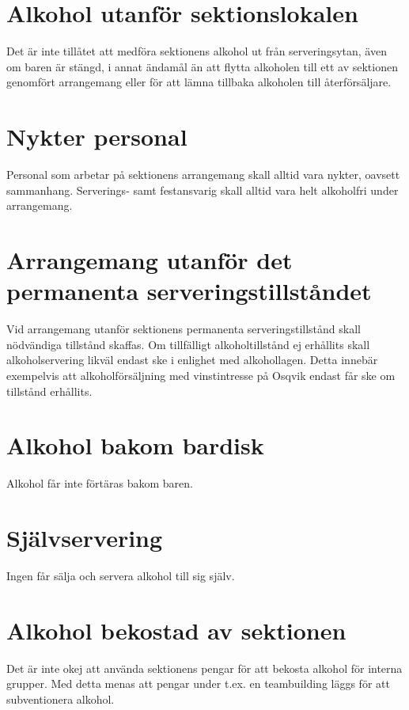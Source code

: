 \documentclass{dgovdoc}
\begin{document}
\section{Alkohol utanför sektionslokalen}

Det är inte tillåtet att medföra sektionens alkohol ut från serveringsytan,
även om baren är stängd, i annat ändamål än att flytta alkoholen till ett av
sektionen genomfört arrangemang eller för att lämna tillbaka alkoholen till
återförsäljare.

\section{Nykter personal}

Personal som arbetar på sektionens arrangemang skall alltid vara nykter,
oavsett sammanhang. Serverings- samt festansvarig skall alltid vara helt
alkoholfri under arrangemang.

\section{Arrangemang utanför det permanenta serveringstillståndet}

Vid arrangemang utanför sektionens permanenta serveringstillstånd skall
nödvändiga tillstånd skaffas. Om tillfälligt alkoholtillstånd ej erhållits
skall alkoholservering likväl endast ske i enlighet med alkohollagen. Detta
innebär exempelvis att alkoholförsäljning med vinstintresse på Osqvik endast
får ske om tillstånd erhållits.

\section{Alkohol bakom bardisk}

Alkohol får inte förtäras bakom baren.

\section{Självservering}

Ingen får sälja och servera alkohol till sig själv.

\section{Alkohol bekostad av sektionen}

Det är inte okej att använda sektionens pengar för att bekosta alkohol för interna grupper. Med detta menas att pengar under t.ex. en teambuilding läggs för att subventionera alkohol. 
\end{document}
